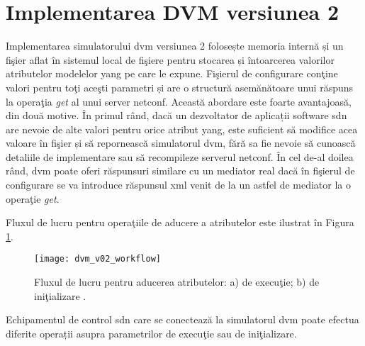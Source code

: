 \section{Implementarea DVM versiunea 2}

Implementarea simulatorului \gls{dvm} versiunea 2 folosește memoria internă și un fişier aflat în sistemul local de fişiere pentru stocarea și întoarcerea valorilor atributelor modelelor \gls{yang} pe care le expune. Fişierul de configurare conţine valori pentru toţi aceşti parametri și are o structură asemănătoare unui răspuns la operaţia \textit{get} al unui server \gls{netconf}. Această abordare este foarte avantajoasă, din două motive. În primul rând, dacă un dezvoltator de aplicații software \gls{sdn} are nevoie de alte valori pentru orice atribut \gls{yang}, este suficient să modifice acea valoare în fişier și să repornească simulatorul \gls{dvm}, fără sa fie nevoie să cunoască detaliile de implementare sau să recompileze serverul \gls{netconf}. În cel de-al doilea rând, \gls{dvm} poate oferi răspunsuri similare cu un mediator real dacă în fişierul de configurare se va introduce răspunsul \gls{xml} venit de la un astfel de mediator la o operaţie \textit{get}.

Fluxul de lucru pentru operaţiile de aducere a atributelor este ilustrat în Figura \ref{fig:dvm_v02_workflow}.

\begin{figure}[h]
	\centering
	\texttt{[image: dvm\_v02\_workflow]}
	\caption{Fluxul de lucru pentru aducerea atributelor: a) de execuţie; b) de iniţializare \cite{stancu2017enabling}.}
	\label{fig:dvm_v02_workflow}
\end{figure}

Echipamentul de control \gls{sdn} care se conectează la simulatorul \gls{dvm} poate efectua diferite operații asupra parametrilor de execuţie sau de iniţializare.